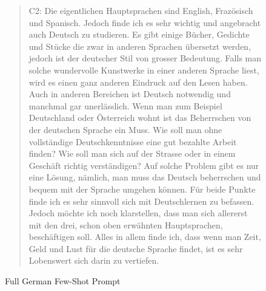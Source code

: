 \begin{figure}[h]
\begin{quotation}
{            C2: Die eigentlichen Hauptsprachen sind English, Frazösisch und Spanisch. Jedoch finde ich es sehr wichtig und angebracht auch Deutsch zu studieren. Es gibt einige Bücher, Gedichte und Stücke die zwar in anderen Sprachen übersetzt werden, jedoch ist der deutscher Stil von grosser Bedeutung. Falls man solche wundervolle Kunstwerke in einer anderen Sprache liest, wird es einen ganz anderen Eindruck auf den Lesen haben. Auch in anderen Bereichen ist Deutsch notwendig und manchmal gar unerlässlich. Wenn man zum Beispiel Deutschland oder Österreich wohnt ist das Beherrschen von der deutschen Sprache ein Muss. Wie soll man ohne vollständige Deutschkenntnisse eine gut bezahlte Arbeit finden? Wie soll man sich auf der Strasse oder in einem Geschäft richtig verständigen? Auf solche Problem gibt es nur eine Lösung, nämlich, man muss das Deutsch beherrschen und bequem mit der Sprache umgehen können. Für beide Punkte finde ich es sehr sinnvoll sich mit Deutschlernen zu befassen. Jedoch möchte ich noch klarstellen, dass man sich allererst mit den drei, schon oben erwähnten Hauptsprachen, beschäftigen soll. Alles in allem finde ich, dass wenn man Zeit, Geld und Lust für die deutsche Sprache findet, ist es sehr Lobenswert sich darin zu vertiefen. \\
        }
    \end{quotation}
    \caption{Full German Few-Shot Prompt}
    \label{qu:few_shot_prompt_complete}
\end{figure}
\captionsetup{labelformat=default}

